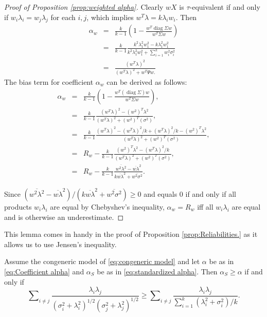 \documentclass[twoside]{article}
\DeclareMathOperator{\diag}{diag}
\DeclareMathOperator{\tsum}{\textstyle \sum}
\renewcommand{\sqrt}[1]{{(#1)^{1/2}}}
\begin{document}
\begin{proof}[Proof of Proposition \ref{prop:weighted alpha}]
\label{proof:weighted alpha}Clearly $wX$ is $\tau$-equivalent
if and only if $w_{i}\lambda_{i}=w_{j}\lambda_{j}$ for each $i,j$,
which implies $w^{T}\lambda=k\lambda_{i}w_{i}$. Then
\begin{eqnarray*}
\alpha_{w} & = & \frac{k}{k-1}\left(1-\frac{w^{T}\diag\Sigma w}{w^{T}\Sigma w}\right)\\
 & = & \frac{k}{k-1}\frac{k^{2}\lambda_{1}^{2}w_{1}^{2}-k\lambda_{1}^{2}w_{1}^{2}}{k^{2}\lambda_{1}^{2}w_{1}^{2}+\tsum_{i=1}^{k}w_{i}^{2}\sigma_{i}^{2}}\\
 & = & \frac{(w^{T}\lambda)^{2}}{(w^{T}\lambda)^{2}+w^{T}\Psi w.}
\end{eqnarray*}
The bias term for coefficient $\alpha_w$ can be derived as follows:
\begin{eqnarray*}
\alpha_{w} & = & \frac{k}{k-1}(1-\frac{w^{T}(\diag\Sigma)w}{w^{T}\Sigma w}),\\
 & = & \frac{k}{k-1}\frac{(w^{T}\lambda)^{2}-(w^{2})^{T}\lambda^{2}}{(w^{T}\lambda)^{2}+(w^{2})^{T}(\sigma^{2})},\\
 & = & \frac{k}{k-1}\frac{(w^{T}\lambda)^{2}-(w^{T}\lambda)^{2}/k+(w^{T}\lambda)^{2}/k-(w^{2})^{T}\lambda^{2}}{(w^{T}\lambda)^{2}+(w^{2})^{T}(\sigma^{2})},\\
 & = &  R_{w}-\frac{k}{k-1}\frac{(w^{2})^{T}\lambda^{2}-(w^{T}\lambda)^{2}/k}{(w^{T}\lambda)^{2}+(w^{2})^{T}(\sigma^{2})},\\
 & = &  R_{w}-\frac{k}{k-1}\frac{\overline{w^{2}\lambda^{2}}-\overline{w\lambda}^{2}}{k\overline{w\lambda}^{2}+\overline{w^{2}\sigma^{2}}}.
\end{eqnarray*}

Since $(\overline{w^{2}\lambda^{2}}-\overline{w\lambda}^{2})/(k\overline{w\lambda}^{2}+\overline{w^{2}\sigma^{2}})\geq0$
and equals $0$ if and only if all products $w_i\lambda_i$ are equal by Chebyshev's inequality, $\alpha_w= R_w$
iff all $w_i\lambda_i$ are equal and is otherwise an underestimate. 
\end{proof}

This lemma comes in handy in the proof of Proposition \ref{prop:Reliabilities.} as it allows us to use Jensen's inequality.

\begin{lem}
\label{lem:alpha_s}
Assume the congeneric model of \eqref{eq:congeneric model} and let $\alpha$ be as in \eqref{eq:Coefficient alpha} and $\alpha_S$ be as in \eqref{eq:standardized alpha}. Then $\alpha_S\geq\alpha$
if and only if
\begin{equation}
\label{eq:Alpha-alpha_s inequality}
\tsum_{i\neq j}\frac{\lambda_{i}\lambda_{j}}{\sqrt{\sigma_{i}^{2}+\lambda_{i}^{2}}\sqrt{\sigma_j^{2}+\lambda_{j}^{2}}} 
\geq
\tsum_{i\neq j}\frac{\lambda_{i}\lambda_{j}}{\tsum_{i=1}^{k}(\lambda_{i}^{2}+\sigma_{i}^{2})/k}.
\end{equation}
\end{lem}
\end{document}
